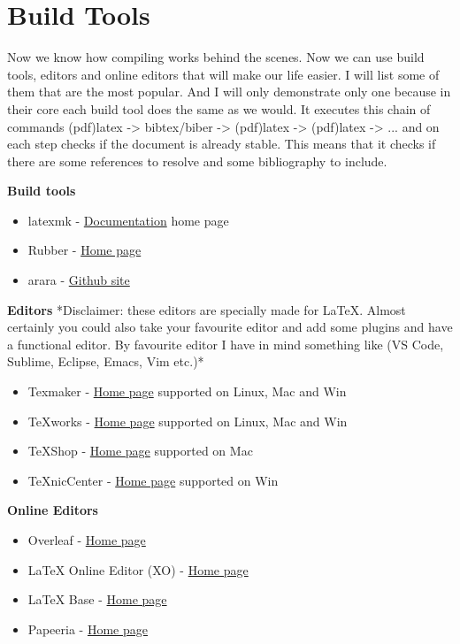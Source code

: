 \documentclass[a4paper,oneside,8pt]{extarticle}
\newcommand{\latex}{\LaTeX\xspace}
\begin{document}
\section{Build Tools}

Now we know how compiling works behind the scenes. Now we can use build tools, editors and online editors that will make our life easier. I will list some of them that are the most popular. And I will only demonstrate only one because in their core each build tool does the same as we would. It executes this chain of commands (pdf)latex -> bibtex/biber -> (pdf)latex -> (pdf)latex -> ... and on each step checks if the document is already stable. This means that it checks if there are some references to resolve and some bibliography to include. 


\textbf{Build tools}\cite{tex_blog}
\begin{itemize}
	\item latexmk - \href{https://mg.readthedocs.io/latexmk.html}{Documentation} home page \cite{latexmk}
	\item Rubber - \href{https://launchpad.net/rubber/}{Home page} \cite{Rubber}
	\item arara - \href{https://github.com/cereda/arara}{Github site} \cite{arara}
\end{itemize}

\textbf{Editors}
*Disclaimer: these editors are specially made for \latex. Almost certainly you could also take your favourite editor and add some plugins and have a functional editor. By favourite editor I have in mind something like (VS Code, Sublime, Eclipse, Emacs, Vim etc.)*
\begin{itemize}
    \item Texmaker - \href{http://www.xm1math.net/texmaker/}{Home page}\cite{texmaker} supported on Linux, Mac and Win
    \item TeXworks - \href{http://www.tug.org/texworks/}{Home page} \cite{texworks} supported on Linux, Mac and Win
    \item TeXShop - \href{https://pages.uoregon.edu/koch/texshop/}{Home page} \cite{texshop} supported on Mac
    \item TeXnicCenter - \href{http://www.texniccenter.org/}{Home page} \cite{texniccenter} supported on Win
\end{itemize}

\textbf{Online Editors}
\begin{itemize}
    \item Overleaf - \href{https://www.overleaf.com/}{Home page} \cite{overleaf}
    \item LaTeX Online Editor (XO) - \href{http://latexonlineeditor.net/}{Home page} \cite{latexonline}
    \item LaTeX Base - \href{https://latexbase.com/}{Home page} \cite{latexbase}
    \item Papeeria - \href{https://papeeria.com/}{Home page} \cite{papeeria}
\end{itemize}
\end{document}
